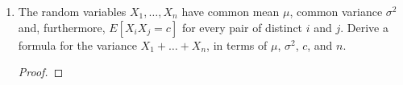 \documentclass[paper=usletter, fontsize=12pt]{article}
\begin{document}
\begin{enumerate}
\begin{enumerate}
\begin{proof}
            \end{proof}

            \item Calculate $E[XY]$.
            \begin{proof}

                \begin{align*}
                    E[XY] & = \int_{0}^{1}\int_{0}^{1-y}2xy\diff{y}\diff{x}\\
                    & = \frac{1}{12} \qedhere
                \end{align*}
                \endgroup

            \end{proof}

            \item Calculate the PDF of $Y/X$.
            \begin{proof}

                \begin{align*}
                    f_X(x) & = \int_{0}^{1-x}2\diff{y}\\
                    & = 2(1-x), \ 0 < x < 1
                \end{align*}
                Then,
                \begin{align*}
                    f_{Y/X}(x) & = \frac{f_{X,Y}(x,y)}{f_X(x)} \\
                    & = \frac{1}{1-x}, \ 0 < y < 1 - x  \qedhere
                \end{align*}

            \end{proof}

        \end{enumerate}

        \item The random variables $X_1,\ldots,X_n$ have common mean $\mu$,
        common variance $\sigma^2$ and, furthermore, $E[X_iX_j=c]$ for every
        pair of distinct $i$ and $j$. Derive a formula for the variance
        $X_1+\ldots+X_n$, in terms of $\mu$, $\sigma^2$, $c$, and $n$.
        \begin{proof}


\end{proof}
\end{enumerate}
\end{document}
